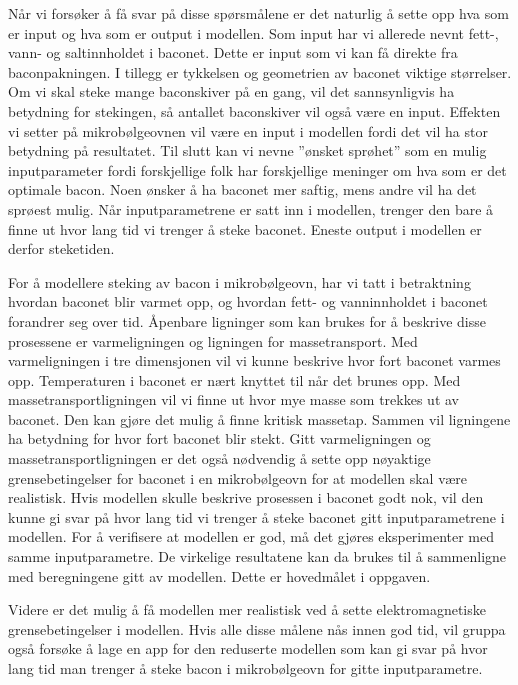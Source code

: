 Når vi forsøker å få svar på disse spørsmålene er det naturlig å sette opp hva som er input og hva
som er output i modellen. Som input har vi allerede nevnt fett-, vann- og saltinnholdet i baconet.
Dette er input som vi kan få direkte fra baconpakningen. I tillegg er tykkelsen og geometrien av
baconet viktige størrelser. Om vi skal steke mange baconskiver på en gang, vil det sannsynligvis ha
betydning for stekingen, så antallet baconskiver vil også være en input. Effekten vi setter på
mikrobølgeovnen vil være en input i modellen fordi det vil ha stor betydning på resultatet. Til
slutt kan vi nevne ”ønsket sprøhet” som en mulig inputparameter fordi forskjellige folk har
forskjellige meninger om hva som er det optimale bacon. Noen ønsker å ha baconet mer saftig, mens
andre vil ha det sprøest mulig. Når inputparametrene er satt inn i modellen, trenger den bare å
finne ut hvor lang tid vi trenger å steke baconet. Eneste output i modellen er derfor steketiden.

For å modellere steking av bacon i mikrobølgeovn, har vi tatt i betraktning hvordan baconet blir
varmet opp, og hvordan fett- og vanninnholdet i baconet forandrer seg over tid. Åpenbare ligninger
som kan brukes for å beskrive disse prosessene er varmeligningen og ligningen for massetransport.
Med varmeligningen i tre dimensjonen vil vi kunne beskrive hvor fort baconet varmes opp.
Temperaturen i baconet er nært knyttet til når det brunes opp. Med massetransportligningen vil vi
finne ut hvor mye masse som trekkes ut av baconet. Den kan gjøre det mulig å finne kritisk massetap.
Sammen vil ligningene ha betydning for hvor fort baconet blir stekt. Gitt varmeligningen og
massetransportligningen er det også nødvendig å sette opp nøyaktige grensebetingelser for baconet i
en mikrobølgeovn for at modellen skal være realistisk. Hvis modellen skulle beskrive prosessen i
baconet godt nok, vil den kunne gi svar på hvor lang tid vi trenger å steke baconet gitt
inputparametrene i modellen. For å verifisere at modellen er god, må det gjøres eksperimenter med
samme inputparametre. De virkelige resultatene kan da brukes til å sammenligne med beregningene gitt
av modellen. Dette er hovedmålet i oppgaven. 

Videre er det mulig å få modellen mer realistisk ved å sette elektromagnetiske grensebetingelser i
modellen. Hvis alle disse målene nås innen god tid, vil gruppa også forsøke å lage en app for den
reduserte modellen som kan gi svar på hvor lang tid man trenger å steke bacon i mikrobølgeovn for
gitte inputparametre.

